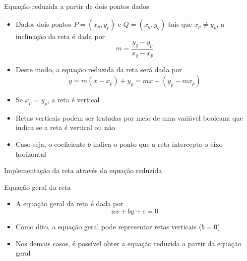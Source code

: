 \begin{frame}[fragile]{Equação reduzida a partir de dois pontos dados}

    \begin{itemize}
        \item Dados dois pontos $P = (x_p, y_p)$ e $Q = (x_q, y_q)$ tais que $x_p \neq y_p$, 
        a inclinação da reta é dada por
        \[
            m = \frac{y_q - y_p}{x_q - x_p}
        \]

        \item Deste modo, a equação reduzida da reta será dada por
        \[
            y = m(x - x_p) + y_p = mx + (y_p - mx_p)
        \]

        \item Se $x_p = y_p$, a reta é vertical

        \item Retas verticais podem ser tratadas por meio de uma variável booleana que indica
            se a reta é vertical ou não

        \item Caso seja, o coeficiente $b$ indica o ponto que a reta intercepta o eixo horizontal
    \end{itemize}

\end{frame}

\begin{frame}[fragile]{Implementação da reta através da equação reduzida}
\end{frame}

\begin{frame}[fragile]{Equação geral da reta}

    \begin{itemize}
        \item A equação geral da reta é dada por
        \[
            ax + by + c = 0
        \]

        \item Como dito, a equação geral pode representar retas verticais ($b = 0$)

        \item Nos demais casos, é possível obter a equação reduzida a partir da equação geral


    \end{itemize}

\end{frame}

